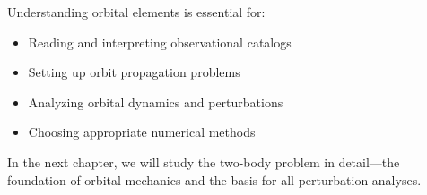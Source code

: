 Understanding orbital elements is essential for:
\begin{itemize}
    \item Reading and interpreting observational catalogs
    \item Setting up orbit propagation problems
    \item Analyzing orbital dynamics and perturbations
    \item Choosing appropriate numerical methods
\end{itemize}

In the next chapter, we will study the two-body problem in detail—the foundation of orbital mechanics and the basis for all perturbation analyses.
